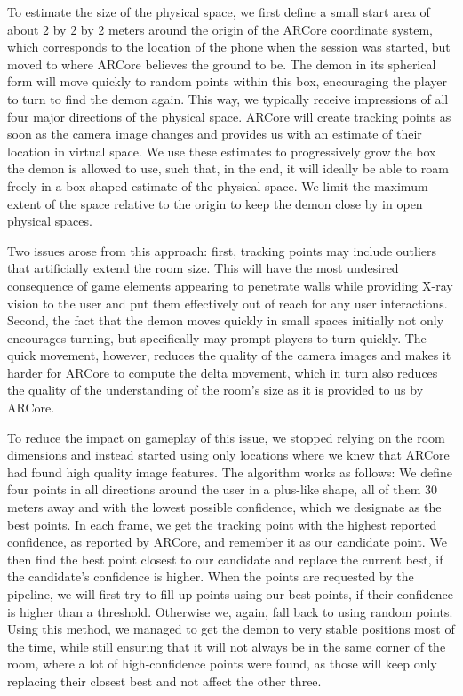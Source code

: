 To estimate the size of the physical space, we first define a small start area of about 2 by 2 by 2 meters around the origin of the ARCore coordinate system, which corresponds to the location of the phone when the session was started, but moved to where ARCore believes the ground to be.
The demon in its spherical form will move quickly to random points within this box, encouraging the player to turn to find the demon again.
This way, we typically receive impressions of all four major directions of the physical space.
ARCore will create tracking points as soon as the camera image changes and provides us with an estimate of their location in virtual space.
We use these estimates to progressively grow the box the demon is allowed to use, such that, in the end, it will ideally be able to roam freely in a box-shaped estimate of the physical space.
We limit the maximum extent of the space relative to the origin to keep the demon close by in open physical spaces.

Two issues arose from this approach: first, tracking points may include outliers that artificially extend the room size.
This will have the most undesired consequence of game elements appearing to penetrate walls while providing X-ray vision to the user and put them effectively out of reach for any user interactions.
Second, the fact that the demon moves quickly in small spaces initially not only encourages turning, but specifically may prompt players to turn quickly.
The quick movement, however, reduces the quality of the camera images and makes it harder for ARCore to compute the delta movement, which in turn also reduces the quality of the understanding of the room's size as it is provided to us by ARCore.

To reduce the impact on gameplay of this issue, we stopped relying on the room dimensions and instead started using only locations where we knew that ARCore had found high quality image features.
The algorithm works as follows: We define four points in all directions around the user in a plus-like shape, all of them 30 meters away and with the lowest possible confidence, which we designate as the best points.
In each frame, we get the tracking point with the highest reported confidence, as reported by ARCore, and remember it as our candidate point.
We then find the best point closest to our candidate and replace the current best, if the candidate's confidence is higher.
When the points are requested by the pipeline, we will first try to fill up points using our best points, if their confidence is higher than a threshold.
Otherwise we, again, fall back to using random points.
Using this method, we managed to get the demon to very stable positions most of the time, while still ensuring that it will not always be in the same corner of the room, where a lot of high-confidence points were found, as those will keep only replacing their closest best and not affect the other three.


